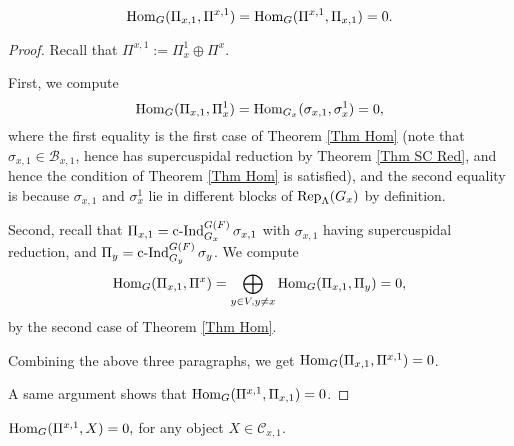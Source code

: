 		
		
		
		
		\begin{lemma}\label{Lem Ortho}
			$$\operatorname{\operatorname{Hom}}_G(\Pi_{x,1}, \Pi^{x,1})=\operatorname{\operatorname{Hom}}_G(\Pi^{x,1}, \Pi_{x,1})=0.$$
		\end{lemma}
		
		\begin{proof}
			Recall that
			$\Pi^{x,1}:=\Pi_x^1 \oplus \Pi^x$.
			
			First, we compute
			$$\operatorname{\operatorname{Hom}}_G(\Pi_{x,1}, \Pi_x^1)=\operatorname{\operatorname{Hom}}_{G_x}(\sigma_{x,1}, \sigma_x^1)=0,$$
			where the first equality is the first case of Theorem \ref{Thm Hom} (note that $\sigma_{x,1} \in \mathcal{B}_{x,1}$, hence has supercuspidal reduction by Theorem \ref{Thm SC Red}, and hence the condition of Theorem \ref{Thm Hom} is satisfied), and the second equality is because $\sigma_{x,1}$ and $\sigma_x^1$ lie in different blocks of $\operatorname{\operatorname{Rep}}_{\Lambda}(G_x)$ by definition.
			
			Second, recall that $\Pi_{x,1}=\operatorname{\operatorname{c-Ind}}_{G_x}^{G(F)}\sigma_{x,1}$ with $\sigma_{x,1}$ having supercuspidal reduction, and $\Pi_y=\operatorname{\operatorname{c-Ind}}_{G_y}^{G(F)}\sigma_y$. We compute 
			$$\operatorname{\operatorname{Hom}}_G(\Pi_{x,1}, \Pi^x)=\bigoplus_{y \in V, y \neq x}\operatorname{\operatorname{Hom}}_G(\Pi_{x,1}, \Pi_y)=0,$$
			by the second case of Theorem \ref{Thm Hom}.
			
			Combining the above three paragraphs, we get $\operatorname{\operatorname{Hom}}_G(\Pi_{x,1}, \Pi^{x,1})=0$.
			
			A same argument shows that $\operatorname{\operatorname{Hom}}_G(\Pi^{x,1}, \Pi_{x,1})=0$.
		\end{proof}
		
		\begin{lemma}\label{Lem Gen}
			$\operatorname{\operatorname{Hom}}_G(\Pi^{x,1}, X)=0,$
			for any object $X \in \mathcal{C}_{x,1}$.
		\end{lemma}
		
